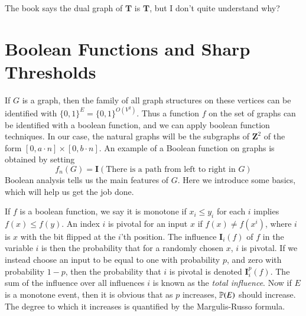 The book says the dual graph of $\mathbf{T}$ is $\mathbf{T}$, but I don't quite understand why?

\section{Boolean Functions and Sharp Thresholds}

If $G$ is a graph, then the family of all graph structures on these vertices can be identified with $\{ 0, 1 \}^E = \{ 0, 1 \}^{O(V^2)}$. Thus a function $f$ on the set of graphs can be identified with a boolean function, and we can apply boolean function techniques. In our case, the natural graphs will be the subgraphs of $\mathbf{Z}^2$ of the form $[0, a \cdot n] \times [0, b \cdot n]$. An example of a Boolean function on graphs is obtained by setting
%
\[ f_n(G) = \mathbf{I}(\text{There is a path from left to right in $G$}) \]
%
Boolean analysis tells us the main features of $G$. Here we introduce some basics, which will help us get the job done.

If $f$ is a boolean function, we say it is monotone if $x_i \leq y_i$ for each $i$ implies $f(x) \leq f(y)$. An index $i$ is pivotal for an input $x$ if $f(x) \neq f(x^i)$, where $i$ is $x$ with the bit flipped at the $i$'th position. The influence $\mathbf{I}_i(f)$ of $f$ in the variable $i$ is then the probability that for a randomly chosen $x$, $i$ is pivotal. If we instead choose an input to be equal to one with probability $p$, and zero with probability $1 - p$, then the probability that $i$ is pivotal is denoted $\mathbf{I}_i^p(f)$. The sum of the influence over all influences $i$ is known as the \emph{total influence}. Now if $E$ is a monotone event, then it is obvious that as $p$ increases, $\operatorname{\mathbb{P}}(E)$ should increase. The degree to which it increases is quantified by the Margulis-Russo formula.

